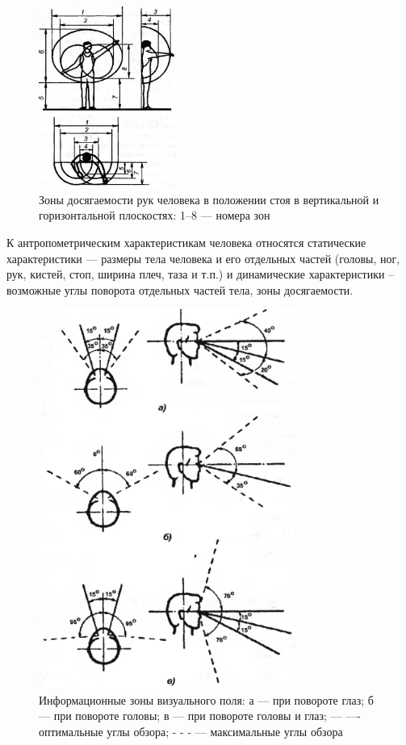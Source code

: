 \begin{figure}
  \centering
  \includegraphics[width=0.4\textwidth]{images/devisilov-6-6}
  \caption{Зоны досягаемости рук человека в положении стоя в вертикальной и горизонтальной плоскостях: 1--8 --- номера зон\label{access-zones}}
\end{figure}

К антропометрическим характеристикам человека относятся статические характеристики --- размеры тела человека и его отдельных частей (головы, ног, рук, кистей, стоп, ширина плеч, таза и т.п.) и динамические характеристики -- возможные углы поворота отдельных частей тела, зоны досягаемости.

\begin{figure}
  \centering
  \includegraphics[width=0.75\textwidth]{images/devisilov-6-7}
  \caption{Информационные зоны визуального поля: а --- при повороте глаз; б --- при повороте головы; в --- при повороте головы и глаз; --- ---- оптимальные углы обзора; - - - --- максимальные углы обзора\label{visual-zones}}
\end{figure}

